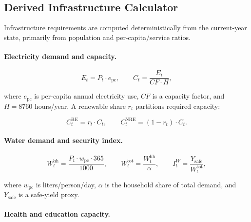 \documentclass[urbansci,article,submit,pdftex,moreauthors]{Definitions/mdpi}
\begin{document}
\subsection{Derived Infrastructure Calculator}
\label{subsec:infrastructure_calc}

Infrastructure requirements are computed deterministically from the
current-year state, primarily from population and per-capita/service ratios.

\paragraph{Electricity demand and capacity.}

\begin{linenomath}
\begin{equation}
E_t = P_t \cdot e_\mathrm{pc}, \qquad
C_t = \frac{E_t}{CF \cdot H},
\end{equation}
\end{linenomath}

where $e_\mathrm{pc}$ is per-capita annual electricity use, $CF$ is a capacity
factor, and $H=8760$ hours/year. A renewable share $r_t$ partitions required
capacity:

\begin{linenomath}
\begin{equation}
C^\mathrm{RE}_t = r_t \cdot C_t, \qquad
C^\mathrm{NRE}_t = (1-r_t)\cdot C_t.
\end{equation}
\end{linenomath}

\paragraph{Water demand and security index.}

\begin{linenomath}
\begin{equation}
W^\mathrm{hh}_t = \frac{P_t \cdot w_\mathrm{pc} \cdot 365}{1000}, \qquad
W^\mathrm{tot}_t = \frac{W^\mathrm{hh}_t}{\alpha}, \qquad
I^W_t = \frac{Y_\mathrm{safe}}{W^\mathrm{tot}_t},
\end{equation}
\end{linenomath}

where $w_\mathrm{pc}$ is liters/person/day, $\alpha$ is the household share of
total demand, and $Y_\mathrm{safe}$ is a safe-yield proxy.

\paragraph{Health and education capacity.}
\end{document}
